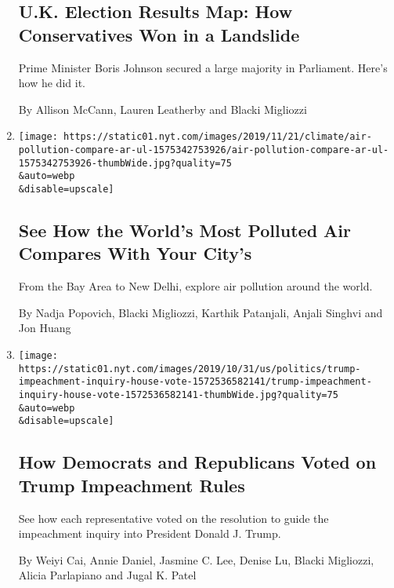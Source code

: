 \begin{enumerate}
  \hypertarget{uk-election-results-map-how-conservatives-won-in-a-landslide}{%
  \subsection{U.K. Election Results Map: How Conservatives Won in a
  Landslide}\label{uk-election-results-map-how-conservatives-won-in-a-landslide}}

  Prime Minister Boris Johnson secured a large majority in Parliament.
  Here's how he did it.

  By Allison McCann, Lauren Leatherby and Blacki Migliozzi
\item
  \href{/interactive/2019/12/02/climate/air-pollution-compare-ar-ul.html}{}

  \texttt{[image: https://static01.nyt.com/images/2019/11/21/climate/air-pollution-compare-ar-ul-1575342753926/air-pollution-compare-ar-ul-1575342753926-thumbWide.jpg?quality=75\\\&auto=webp\\\&disable=upscale]}

  \hypertarget{see-how-the-worlds-most-polluted-air-compares-with-your-citys}{%
  \subsection{See How the World's Most Polluted Air Compares With Your
  City's}\label{see-how-the-worlds-most-polluted-air-compares-with-your-citys}}

  From the Bay Area to New Delhi, explore air pollution around the
  world.

  By Nadja Popovich, Blacki Migliozzi, Karthik Patanjali, Anjali Singhvi
  and Jon Huang
\item
  \href{/interactive/2019/10/31/us/politics/trump-impeachment-inquiry-house-vote.html}{}

  \texttt{[image: https://static01.nyt.com/images/2019/10/31/us/politics/trump-impeachment-inquiry-house-vote-1572536582141/trump-impeachment-inquiry-house-vote-1572536582141-thumbWide.jpg?quality=75\\\&auto=webp\\\&disable=upscale]}

  \hypertarget{how-democrats-and-republicans-voted-on-trump-impeachment-rules}{%
  \subsection{How Democrats and Republicans Voted on Trump Impeachment
  Rules}\label{how-democrats-and-republicans-voted-on-trump-impeachment-rules}}

  See how each representative voted on the resolution to guide the
  impeachment inquiry into President Donald J. Trump.

  By Weiyi Cai, Annie Daniel, Jasmine C. Lee, Denise Lu, Blacki
  Migliozzi, Alicia Parlapiano and Jugal K. Patel
\end{enumerate}

